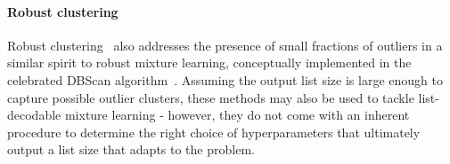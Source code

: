 \paragraph{Robust clustering}
Robust clustering~\cite{garcia2010} also addresses the presence of small fractions of outliers in a similar spirit to robust mixture learning, conceptually implemented in the celebrated DBScan algorithm~\citep{ester1996density}. Assuming the output list size is large enough to capture possible outlier clusters, these methods may also be used to tackle list-decodable mixture learning - however, they do not come with an inherent procedure to determine the right choice of hyperparameters that ultimately output a list size that adapts to the problem. 
